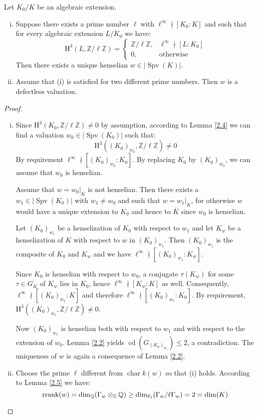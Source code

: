 \begin{proposition}\label{2.6}
Let $K_0/K$ be an algebraic extension.
\begin{enumerate}[(i)]
\item Suppose there exists a prime number $\ell$ with $\ell^\infty\nmid[K_0:K]$ and such that for every algebraic extension $L/K_0$ we have: 
\[ \mathrm{H}^3(L,\mathbb{Z}/\ell\mathbb{Z}) = \begin{cases}
\mathbb{Z}/\ell\mathbb{Z}, & \ell^\infty\nmid [L:K_0]\\
0, & \text{otherwise}
\end{cases} \]
Then there exists a unique henselian $w\in|\operatorname{Spv}(K)|$.
\item Assume that (i) is satisfied for two different prime numbers. Then $w$ is a defectless valuation.
\end{enumerate}
\end{proposition}

\begin{proof}
\begin{enumerate}[(i)]
\item Since $\mathrm{H}^3(K_0, \mathbb{Z}/\ell\mathbb{Z})\neq 0$ by assumption, according to Lemma \ref{2.4} we can find a valuation $w_0\in|\operatorname{Spv}(K_0)|$ such that:
\[ \mathrm{H}^3((K_0)_{w_0}, \mathbb{Z}/\ell\mathbb{Z}) \neq 0 \]
By requirement $\ell^\infty \nmid [(K_0)_{w_0} : K_0]$. By replacing $K_0$ by $(K_0)_{w_0}$, we can assume that $w_0$ is henselian.

Assume that $w = w_0|_K$ is not henselian. Then there exists a $w_1\in|\operatorname{Spv}(K_0)|$ with $w_1\neq w_0$ and such that $w = w_1|_K$, for otherwise $w$ would have a unique extension to $K_0$ and hence to $\overline{K}$ since $w_0$ is henselian.

Let $(K_0)_{w_1}$ be a henselization of $K_0$ with respect to $w_1$ and let $K_w$ be a henselization of $K$ with respect to $w$ in $(K_0)_{w_1}$. Then $(K_0)_{w_1}$ is the composite of $K_0$ and $K_w$ and we have $\ell^\infty\nmid [(K_0)_{w_1} : K_w]$.

Since $K_0$ is henselian with respect to $w_0$, a conjugate $\tau(K_w)$ for some $\tau\in G_K$ of $K_w$ lies in $K_0$, hence $\ell^\infty\nmid [K_w : K]$ as well. Consequently, $\ell^\infty \nmid [(K_0)_{w_1} : K]$ and therefore $\ell^\infty \nmid [(K_0)_{w_1} : K_0]$. By requirement, $\mathrm{H}^3((K_0)_{w_1}, \mathbb{Z}/\ell\mathbb{Z}) \neq 0$.

Now $(K_0)_{w_1}$ is henselian both with respect to $w_1$ and with respect to the extension of $w_0$. Lemma \ref{2.2} yields $\operatorname{cd}(G_{(K_0)_{w_1}})\leq 2$, a contradiction. The uniqueness of $w$ is again a consequence of Lemma \ref{2.2}.
\item Choose the prime $\ell$ different from $\operatorname{char} k(w)$ so that (i) holds. According to Lemma \ref{2.5} we have:
\[\operatorname{rrank}(w)=\dim_\mathbb{Q}(\Gamma_w\otimes_\mathbb{Z}\mathbb{Q} )\geq \dim_{\mathbb{F}_\ell}(\Gamma_w /\ell\Gamma_w) = 2 = \dim(K)\qedhere\]
\end{enumerate}
\end{proof}

